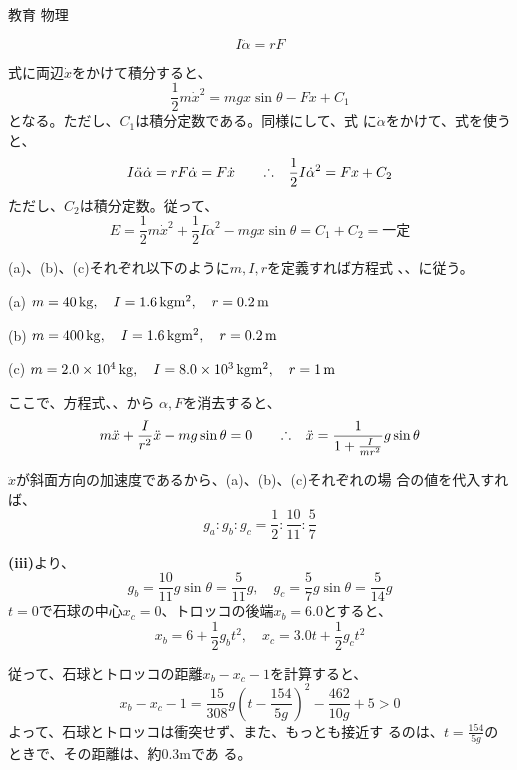 \documentclass[fleqn]{jbook}
\begin{document}
\begin{answer}{教育 物理}{}
  \begin{subanswers}
    \SubAnswer

    \begin{subsubanswers}
      \SubSubAnswer
      \[
      I\ddot \alpha = rF
      \]
      
      \SubSubAnswer
      式に両辺$\dot x$をかけて積分すると、
      \[
      \frac{1}{2}m\dot x^2=mgx\sin\theta-Fx+C_1
      \]
      となる。ただし、$C_1$は積分定数である。同様にして、式
      に$\dot \alpha$をかけて、式を使うと、
      \[
      I\ddot\alpha \dot\alpha=rF\dot\alpha=F\dot x \qquad
      \Yueni \frac{1}{2}I\dot \alpha^2=Fx+C_2
      \]
      ただし、$C_2$は積分定数。従って、
      \[
      E=\frac{1}{2}m\dot x^2+\frac{1}{2}I\dot
      \alpha^2-mgx\sin\theta=C_1+C_2=\mbox{一定}
      \]
      
      \SubSubAnswer
      (a)、(b)、(c)それぞれ以下のように$m,I,r$を定義すれば方程式
      、、に従う。
      
      (a) $m=40\,{\rm kg},\quad I=1.6\,{\rm kgm^2},\quad r=0.2\,{\rm m}$
      
      (b) $m=400\,{\rm kg},\quad I=1.6\,{\rm kgm^2},\quad r=0.2\,{\rm m}$
      
      (c) $m=2.0\times 10^4\,{\rm kg},\quad I=8.0\times 10^3\,{\rm kgm^2},\quad r=1\,{\rm m}$
      
      ここで、方程式、、から
      $\alpha,F$を消去すると、
      \[
      m\ddot x+\frac{I}{r^2}\ddot x - mg\sin\theta = 0 \qquad
      \Yueni \ddot x = \frac{1}{1+\frac{I}{mr^2}}g\sin\theta
      \]
      
      $\ddot x$が斜面方向の加速度であるから、(a)、(b)、(c)それぞれの場
      合の値を代入すれば、
      \[
      g_a:g_b:g_c=\frac{1}{2}:\frac{10}{11}:\frac{5}{7}
      \]
      
      \SubSubAnswer
      {\bf(iii)}より、
      \[
      g_b=\frac{10}{11}g\sin\theta=\frac{5}{11}g,\quad
      g_c=\frac{5}{7}g\sin\theta=\frac{5}{14}g
      \]
      $t=0$で石球の中心$x_c=0$、トロッコの後端$x_b=6.0$とすると、
      \[
      x_b=6+\frac{1}{2}g_bt^2,\quad x_c=3.0t+\frac{1}{2}g_ct^2
      \]
      
      従って、石球とトロッコの距離$x_b-x_c-1$を計算すると、
        \[
        x_b-x_c-1=\frac{15}{308}g\left(t-\frac{154}{5g}\right)^2-\frac{462}{10g}+5>0
        \] 
        よって、石球とトロッコは衝突せず、また、もっとも接近す
        るのは、$t=\frac{154}{5g}$のときで、その距離は、約0.3mであ
        る。



\end{subsubanswers}
\end{subanswers}
\end{answer}
\end{document}

